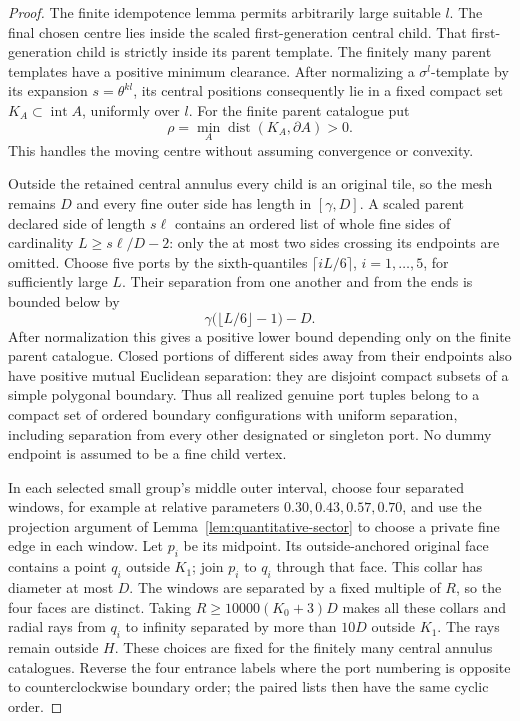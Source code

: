 \documentclass[11pt,a4paper]{article}
\theoremstyle{remark}
\begin{document}
\begin{proof}
The finite idempotence lemma permits arbitrarily large suitable $l$.
The final chosen centre lies inside the scaled first-generation central
child.  That first-generation child is strictly inside its parent
template.  The finitely many parent templates have a positive minimum
clearance.  After normalizing a $\sigma^l$-template by its expansion
$s=\theta^{kl}$, its central positions consequently lie in a fixed compact
set $K_A\subset\operatorname{int}A$, uniformly over $l$.
For the finite parent catalogue put
\[
 \rho=\min_A\operatorname{dist}(K_A,\partial A)>0.
\]
This handles the moving centre without assuming convergence or convexity.

Outside the retained central annulus every child is an original tile,
so the mesh remains $D$ and every fine outer side has length in
$[\gamma,D]$.  A scaled parent declared side of length $s\ell$ contains
an ordered list of whole fine sides of cardinality
$L\ge s\ell/D-2$: only the at most two sides crossing its endpoints
are omitted.  Choose five ports by the sixth-quantiles
$\lceil iL/6\rceil$, $i=1,\ldots,5$, for sufficiently large $L$.
Their separation from one another and from the ends is bounded below by
\[
 \gamma\bigl(\lfloor L/6\rfloor-1\bigr)-D.
\]
After normalization this gives a positive lower bound depending only on
the finite parent catalogue.  Closed portions of different sides away
from their endpoints also have positive mutual Euclidean separation:
they are disjoint compact subsets of a simple polygonal boundary.
Thus all realized genuine port tuples belong to a compact set of ordered
boundary configurations with uniform separation, including separation
from every other designated or singleton port.  No dummy endpoint is
assumed to be a fine child vertex.

In each selected small group's middle outer interval, choose four
separated windows, for example at relative parameters
$0.30,0.43,0.57,0.70$, and use the projection argument of
Lemma~\ref{lem:quantitative-sector} to choose a private fine edge in
each window.  Let $p_i$ be its midpoint.  Its outside-anchored original
face contains a point $q_i$ outside $K_1$; join $p_i$ to $q_i$ through
that face.  This collar has diameter at most $D$.  The windows are
separated by a fixed multiple of $R$, so the four faces are distinct.
Taking $R\ge10000(K_0+3)D$ makes all these collars and radial rays from
$q_i$ to infinity separated by more than $10D$ outside $K_1$.
The rays remain outside $H$.  These choices are fixed for the finitely
many central annulus catalogues.  Reverse the four entrance labels
where the port numbering is opposite to counterclockwise boundary order;
the paired lists then have the same cyclic order.


\end{proof}
\end{document}

